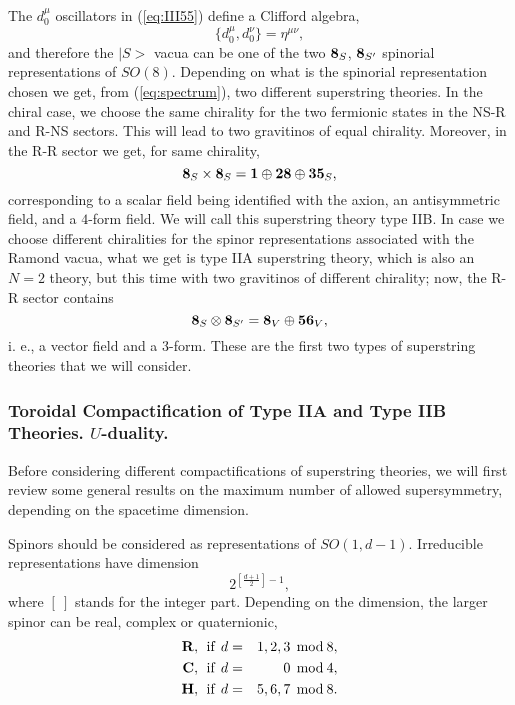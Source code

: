 The $d_0^{\mu}$ oscillators in (\ref{eq:III55}) define a Clifford
algebra,
\begin{equation}
\{d_0^{\mu},d_0^{\nu}\} = \eta^{\mu \nu},
\label{eq:III57}
\end{equation}
and therefore the $|S>$ vacua can be one of the two ${\bf 8}_S$,
${\bf 8}_{S'}$ spinorial representations of $SO(8)$. Depending on
what is the spinorial representation chosen we get, from
(\ref{eq:spectrum}), two different superstring theories. In the
chiral case, we choose the same chirality for the two fermionic
states in the NS-R and R-NS sectors. This will lead to two
gravitinos of equal chirality. Moreover, in the R-R sector we
get, for same chirality,
\begin{equation}
{\bf 8}_S \times {\bf 8}_S = {\bf 1} \oplus {\bf 28} \oplus {\bf 35}_S,
\label{eq:III58}
\end{equation}
corresponding to a scalar field being identified with the axion,
an antisymmetric field, and a $4$-form field. We will call this
superstring theory type IIB. In case we choose different
chiralities for the spinor representations associated with the
Ramond vacua, what we get is type IIA superstring theory, which
is also an $N\!=\!2$ theory, but this time with two gravitinos of 
different chirality; now, the R-R sector contains
\begin{equation}
{\bf 8}_S \otimes {\bf 8}_{S'} = {\bf 8}_V \oplus {\bf 56}_V, 
\label{eq:III59}
\end{equation}
i. e., a vector field and a $3$-form. These are the first two
types of superstring theories that we will consider.

\subsubsection{Toroidal Compactification of Type IIA and Type IIB
Theories. $U$-duality.}
\label{susy}

Before considering different compactifications of superstring
theories, we will first review some general results on the
maximum number of allowed supersymmetry, depending on the
spacetime dimension.

  

Spinors should be considered as representations of
$SO(1,d-1)$. Irreducible representations have dimension
\begin{equation}
2^{\left[ \frac {d+1}{2} \right]-1},
\label{eq:a1}
\end{equation}
where $[ \: ]$ stands for the integer part. Depending on the
dimension, the larger spinor can be real, complex or
quaternionic,
\begin{eqnarray}
{\bf R}, \: \: \hbox {if} \: \: d & = & 1,2,3 \: \: \hbox {mod} \: 8,
\nonumber \\
{\bf C}, \: \: \hbox {if} \: \: d & = & 0 \: \: \hbox {mod} \: 4, \nonumber
\\
{\bf H}, \: \: \hbox {if} \: \: d & = & 5,6,7 \: \: \hbox {mod} \: 8.
\label{eq:a2}
\end{eqnarray}
  
